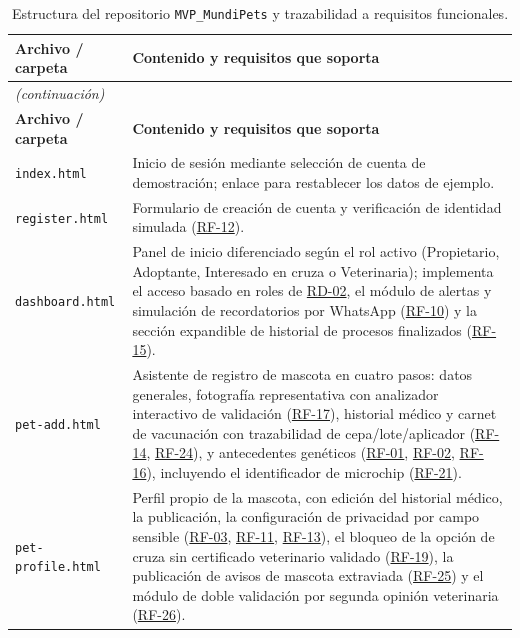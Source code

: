\documentclass[journal,onecolumn]{IEEEtran}
\begin{document}
	\begin{longtable}{@{}p{4.2cm} p{10.6cm}@{}}
		\caption{Estructura del repositorio \texttt{MVP\_MundiPets} y trazabilidad a requisitos funcionales.}
		\label{tab:estructura-mvp} \\
		\hline
		\textbf{Archivo / carpeta} & \textbf{Contenido y requisitos que soporta} \\
		\hline
		\endfirsthead
		\multicolumn{2}{|l|}{\textit{(continuación)}} \\
		\hline
		\textbf{Archivo / carpeta} & \textbf{Contenido y requisitos que soporta} \\
		\hline
		\endhead
		\hline
		\endfoot
		\texttt{index.html} & Inicio de sesión mediante selección de cuenta de demostración; enlace para restablecer los datos de ejemplo. \\
		\hline
		\texttt{register.html} & Formulario de creación de cuenta y verificación de identidad simulada (\hyperref[tab:RF-12]{RF-12}). \\
		\hline
		\texttt{dashboard.html} & Panel de inicio diferenciado según el rol activo (Propietario, Adoptante, Interesado en cruza o Veterinaria); implementa el acceso basado en roles de \hyperref[tab:RD-02]{RD-02}, el módulo de alertas y simulación de recordatorios por WhatsApp (\hyperref[tab:RF-10]{RF-10}) y la sección expandible de historial de procesos finalizados (\hyperref[tab:RF-15]{RF-15}). \\
		\hline
		\texttt{pet-add.html} & Asistente de registro de mascota en cuatro pasos: datos generales, fotografía representativa con analizador interactivo de validación (\hyperref[tab:RF-17]{RF-17}), historial médico y carnet de vacunación con trazabilidad de cepa/lote/aplicador (\hyperref[tab:RF-14]{RF-14}, \hyperref[tab:RF-24]{RF-24}), y antecedentes genéticos (\hyperref[tab:RF-01]{RF-01}, \hyperref[tab:RF-02]{RF-02}, \hyperref[tab:RF-16]{RF-16}), incluyendo el identificador de microchip (\hyperref[tab:RF-21]{RF-21}). \\
		\hline
		\texttt{pet-profile.html} & Perfil propio de la mascota, con edición del historial médico, la publicación, la configuración de privacidad por campo sensible (\hyperref[tab:RF-03]{RF-03}, \hyperref[tab:RF-11]{RF-11}, \hyperref[tab:RF-13]{RF-13}), el bloqueo de la opción de cruza sin certificado veterinario validado (\hyperref[tab:RF-19]{RF-19}), la publicación de avisos de mascota extraviada (\hyperref[tab:RF-25]{RF-25}) y el módulo de doble validación por segunda opinión veterinaria (\hyperref[tab:RF-26]{RF-26}). \\

\end{longtable}
\end{document}
